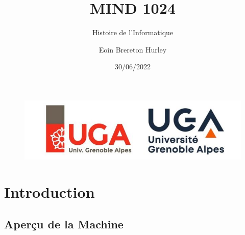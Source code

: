 \documentclass{beamer}
\author{Eoin Brereton Hurley}
\title{MIND 1024}
\subtitle{Histoire de l'Informatique}
\institute{Université Grenoble Alpes}
\date{30/06/2022}
\begin{document}
\kaishu
\begin{frame}
    \titlepage
    \begin{figure}[htpb]
        \begin{center}
            \includegraphics[width=0.75\linewidth]{pic/Logos-UGA.jpeg}
        \end{center}
    \end{figure}
\end{frame}

\begin{frame}
    \tableofcontents[sectionstyle=show,subsectionstyle=show/shaded/hide,subsubsectionstyle=show/shaded/hide]
\end{frame}


\section{Introduction}

\subsection{Aperçu de la Machine}
\end{document}
